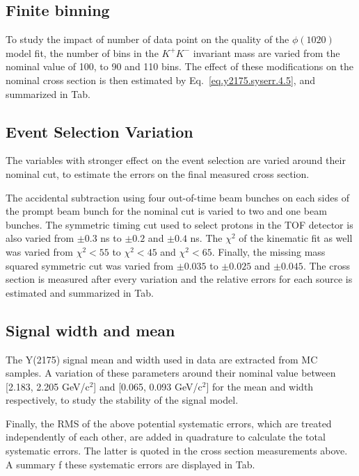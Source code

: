 \subsection{Finite binning}
\label{chap.y2175.syserr.bin}

To study the impact of number of data point on the quality of the $\phi(1020)$ model fit, the number of bins in the $K^+K^-$ invariant mass are varied from the nominal value of 100, to 90 and 110 bins. The effect of these modifications on the nominal cross section is then estimated by Eq.~\ref{eq.y2175.syserr.4.5}, and summarized in Tab.

\subsection{Event Selection Variation}
\label{chap.y2175.syserr.evt}

The variables with stronger effect on the event selection are varied around their nominal cut, to estimate the errors on the final measured cross section.
\par The accidental subtraction using four out-of-time beam bunches on each sides of the prompt beam bunch for the nominal cut is varied to two and one beam bunches. The symmetric timing cut used to select protons in the TOF detector is also varied from $\pm 0.3$ ns to $\pm 0.2$ and $\pm 0.4$ ns. The $\chi^2$ of the kinematic fit as well was varied from $\chi^{2}<55$ to $\chi^{2}<45$ and $\chi^{2}<65$. Finally, the missing mass squared symmetric cut was varied from $\pm 0.035$ to $\pm 0.025$ and $\pm 0.045$. The cross section is measured after every variation and the relative errors for each source is estimated and summarized in Tab.

\subsection{Signal width and mean}
\label{chap.y2175.syserr.sig}

The Y(2175) signal mean and width used in data are extracted from MC samples. A variation of these parameters around their nominal value between [2.183, 2.205 GeV/c$^2$] and [0.065, 0.093 GeV/c$^2$] for the mean and width respectively, to study the stability of the signal model.

Finally, the RMS of the above potential systematic errors, which are treated independently of each other, are added in quadrature to calculate the total systematic errors. The latter is quoted in the cross section measurements above. A summary f these systematic errors are displayed in Tab.

